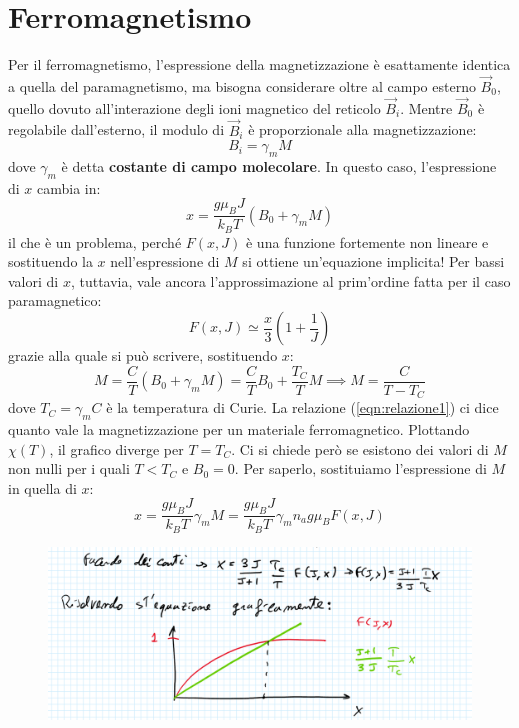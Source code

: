 \documentclass{book}
\begin{document}
     \section{Ferromagnetismo}
        Per il ferromagnetismo, l'espressione della magnetizzazione è esattamente identica a quella del paramagnetismo, ma bisogna considerare oltre al campo esterno $\vec{B}_{0}$, quello dovuto all'interazione degli ioni magnetico del reticolo $\vec{B}_{i}$. Mentre $\vec{B}_{0}$ è regolabile dall'esterno, il modulo di $\vec{B}_{i}$ è proporzionale alla magnetizzazione:
        \begin{equation}
            B_{i} = \gamma_{m} M
        \end{equation}
        dove $\gamma_{m}$ è detta \textbf{costante di campo molecolare}. In questo caso, l'espressione di $x$ cambia in:
        \begin{equation}
            x = \frac{g \mu_{B} J}{k_{B}T}(B_{0}+\gamma_{m}M)
        \end{equation}
        il che è un problema, perché $F(x,J)$ è una funzione fortemente non lineare e sostituendo la $x$ nell'espressione di $M$ si ottiene un'equazione implicita! Per bassi valori di $x$, tuttavia, vale ancora l'approssimazione al prim'ordine fatta per il caso paramagnetico:
        \begin{equation}
            F(x,J) \simeq \frac{x}{3}(1+\frac{1}{J})
        \end{equation}
        grazie alla quale si può scrivere, sostituendo $x$:
        \begin{equation}
        \label{eqn:relazione1}
            M = \frac{C}{T}(B_{0}+\gamma_{m}M) = \frac{C}{T}B_{0}+\frac{T_{C}}{T}M \implies M = \frac{C}{T-T_{C}}
        \end{equation}
        dove $T_{C} = \gamma_{m}C$ è la temperatura di Curie. 
        \newpage
        La relazione (\ref{eqn:relazione1}) ci dice quanto vale la magnetizzazione per un materiale ferromagnetico. Plottando $\chi(T)$, il grafico diverge per $T=T_{C}$. Ci si chiede però se esistono dei valori di $M$ non nulli per i quali $T<T_{C}$ e $B_{0} = 0$. Per saperlo, sostituiamo l'espressione di $M$ in quella di $x$:
        \begin{equation}
            x = \frac{g \mu_{B}J}{k_{B}T} \gamma_{m} M = \frac{g \mu_{B}J}{k_{B}T} \gamma_{m} n_{a}g\mu_{B}F(x,J) 
        \end{equation}
        \begin{figure}[h!]
            \centering
            \includegraphics[width=0.75\linewidth]{img/asset5.png}
        \end{figure}
\end{document}
